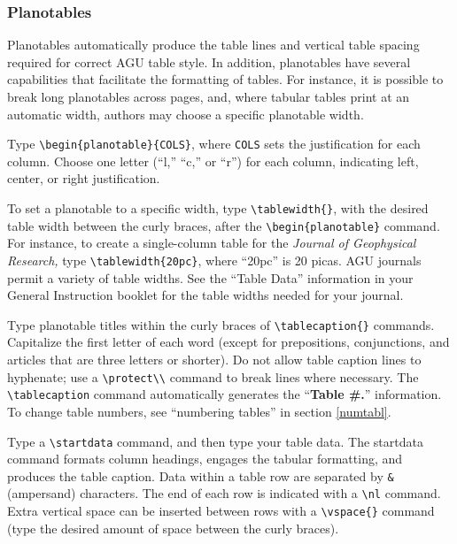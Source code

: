 \begin{article}
\subsubsection{Planotables}\label{tbl-sec}

Planotables automatically produce the table lines and
vertical table spacing required for correct AGU table style.
In addition, planotables have several capabilities that 
facilitate the formatting of tables.  For instance, 
it is possible to break long planotables across pages, 
and, where tabular tables print at an automatic width,
authors may choose a specific planotable width.

Type \verb"\begin{planotable}{COLS}", 
where {\tt COLS} \linebreak 
sets the justification for each column.
Choose one letter (``l,'' ``c,'' or ``r'') for each 
column, indicating left, center, or right justification.

To set a planotable to a specific width, type \linebreak
\verb"\tablewidth{}", with the desired table width between 
the curly braces, after the \verb"\begin{planotable}" 
command.  For instance, to create a single-column table 
for the {\it Journal of Geophysical Research,} type 
\verb"\tablewidth{20pc}", where ``20pc'' is 20 picas.
AGU journals permit a variety of table widths.  See the 
``Table Data'' information in your General Instruction 
booklet for the table widths needed for your journal.

Type planotable titles within the curly braces of
\verb"\tablecaption{}" commands.  Capitalize the first
letter of each word (except for prepositions, conjunctions,
and articles that are three letters or shorter).  Do not
allow table caption lines to hyphenate; use a
\verb"\protect\\" command to break lines where necessary.
The \verb"\tablecaption" command automatically generates
the ``{\bf Table \#.}'' information.  To change table
numbers, see ``numbering tables'' in section \ref{numtabl}.

Type a \verb"\startdata" command, and then type your table
data.  The startdata command formats column headings, 
engages the tabular formatting, and produces the table 
caption.  Data within a table row are separated by {\tt \&} 
(ampersand) characters.  The end of each row is indicated 
with a \verb"\nl" command.  Extra vertical space can be 
inserted between rows with a \verb"\vspace{}" command 
(type the desired amount of space between the curly
braces).


\end{article}
